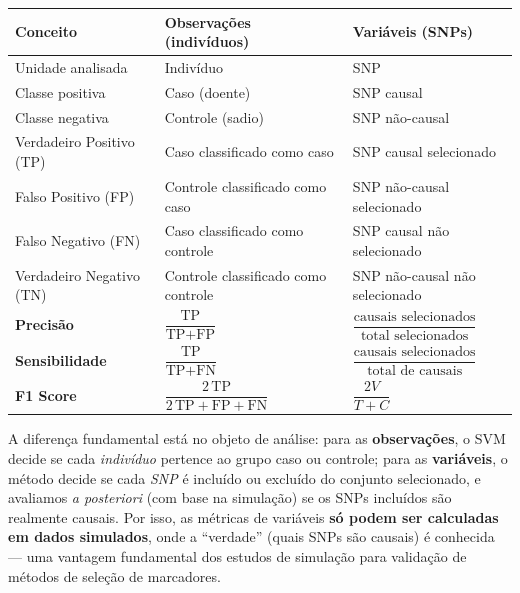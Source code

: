 \documentclass[12pt,a4paper]{article}
\newcommand{\novo}[1]{\textcolor{corNova}{#1}}
\renewcommand{\arraystretch}{1.3}
\begin{document}
\begin{center}
\footnotesize
\setlength{\tabcolsep}{4pt}
\renewcommand{\arraystretch}{1.5}
\begin{tabular}{L{3.2cm}|L{4.8cm}|L{4.8cm}}
  \textbf{Conceito} & \textbf{Observações (indivíduos)} & \textbf{Variáveis (SNPs)} \\
  \hline
  Unidade analisada & Indivíduo & SNP \\
  \hline
  Classe positiva & Caso (doente) & SNP causal \\
  \hline
  Classe negativa & Controle (sadio) & SNP não-causal \\
  \hline
  Verdadeiro Positivo (TP) & Caso classificado como caso & SNP causal selecionado \\
  \hline
  Falso Positivo (FP) & Controle classificado como caso & SNP não-causal selecionado \\
  \hline
  Falso Negativo (FN) & Caso classificado como controle & SNP causal não selecionado \\
  \hline
  Verdadeiro Negativo (TN) & Controle classificado como controle & SNP não-causal não selecionado \\
  \hline
  \textbf{Precisão} & $\dfrac{\text{TP}}{\text{TP}+\text{FP}}$ & $\dfrac{\text{causais selecionados}}{\text{total selecionados}}$ \\[6pt]
  \hline
  \textbf{Sensibilidade} & $\dfrac{\text{TP}}{\text{TP}+\text{FN}}$ & $\dfrac{\text{causais selecionados}}{\text{total de causais}}$ \\[6pt]
  \hline
  \textbf{F1 Score} & $\dfrac{2\,\text{TP}}{2\,\text{TP}+\text{FP}+\text{FN}}$ & $\dfrac{2V}{T + C}$  \\[6pt]
\end{tabular}
\end{center}
\renewcommand{\arraystretch}{1.3}

\novo{A diferença fundamental está no objeto de análise: para as \textbf{observações}, o SVM decide se cada \emph{indivíduo} pertence ao grupo caso ou controle; para as \textbf{variáveis}, o método decide se cada \emph{SNP} é incluído ou excluído do conjunto selecionado, e avaliamos \textit{a posteriori} (com base na simulação) se os SNPs incluídos são realmente causais. Por isso, as métricas de variáveis \textbf{só podem ser calculadas em dados simulados}, onde a ``verdade'' (quais SNPs são causais) é conhecida --- uma vantagem fundamental dos estudos de simulação para validação de métodos de seleção de marcadores.}
\end{document}
